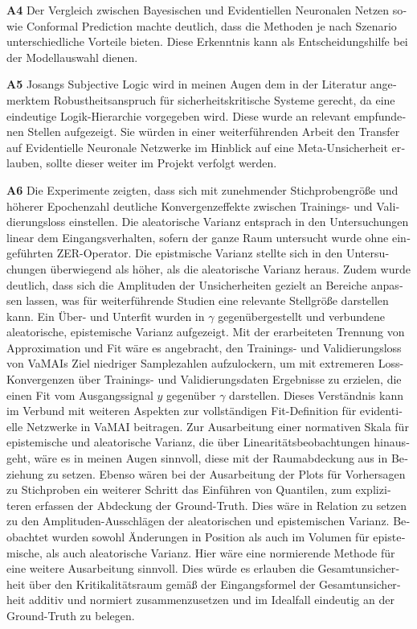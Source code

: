 \begin{otherlanguage}{ngerman}
\textbf{A4} Der Vergleich zwischen Bayesischen und Evidentiellen Neuronalen Netzen sowie Conformal Prediction machte deutlich, dass die Methoden je nach Szenario unterschiedliche Vorteile bieten. Diese Erkenntnis kann als Entscheidungshilfe bei der Modellauswahl dienen.

\textbf{A5} Josangs \glqq{}Subjective Logic\grqq{} wird in meinen Augen dem in der Literatur angemerktem Robustheitsanspruch für sicherheitskritische Systeme gerecht, da eine eindeutige  Logik-Hierarchie vorgegeben wird. Diese wurde an relevant empfundenen Stellen aufgezeigt. Sie würden in einer weiterführenden Arbeit den Transfer auf Evidentielle Neuronale Netzwerke im Hinblick auf eine Meta-Unsicherheit erlauben, sollte dieser weiter im Projekt verfolgt werden.

\textbf{A6} Die Experimente zeigten, dass sich mit zunehmender Stichprobengröße und höherer Epochenzahl deutliche Konvergenzeffekte zwischen Trainings- und Validierungsloss einstellen. Die aleatorische Varianz entsprach in den Untersuchungen linear dem Eingangsverhalten, sofern der ganze Raum untersucht wurde ohne eingeführten ZER-Operator. Die epistmische Varianz stellte sich in den Untersuchungen überwiegend als höher, als die aleatorische Varianz heraus. Zudem wurde deutlich, dass sich die Amplituden der Unsicherheiten gezielt an Bereiche anpassen lassen, was für weiterführende Studien eine relevante Stellgröße darstellen kann. Ein Über- und Unterfit wurden in $\gamma$ gegenübergestellt und verbundene aleatorische, epistemische Varianz aufgezeigt. Mit der erarbeiteten Trennung von Approximation und Fit wäre es angebracht, den Trainings- und Validierungsloss von VaMAIs Ziel niedriger Samplezahlen aufzulockern, um mit extremeren Loss-Konvergenzen über Trainings- und Validierungsdaten Ergebnisse zu erzielen, die einen Fit vom Ausgangssignal $y$ gegenüber $\gamma$ darstellen. Dieses Verständnis kann im Verbund mit weiteren Aspekten zur vollständigen Fit-Definition für evidentielle Netzwerke in VaMAI beitragen. Zur Ausarbeitung einer normativen Skala für epistemische und aleatorische Varianz, die über Linearitätsbeobachtungen hinausgeht, wäre es in meinen Augen sinnvoll, diese mit der Raumabdeckung aus in Beziehung zu setzen. Ebenso wären bei der Ausarbeitung der Plots für Vorhersagen zu Stichproben ein weiterer Schritt das Einführen von Quantilen, zum expliziteren erfassen der Abdeckung der Ground-Truth. Dies wäre in Relation zu setzen zu den Amplituden-Ausschlägen der aleatorischen und epistemischen Varianz. Beobachtet wurden sowohl Änderungen in Position als auch im Volumen für epistemische, als auch aleatorische Varianz. Hier wäre eine normierende Methode für eine weitere Ausarbeitung sinnvoll. Dies würde es erlauben die Gesamtunsicherheit über den Kritikalitätsraum gemäß der Eingangsformel der Gesamtunsicherheit additiv und normiert zusammenzusetzen und im Idealfall eindeutig an der Ground-Truth zu belegen.



\end{otherlanguage}
